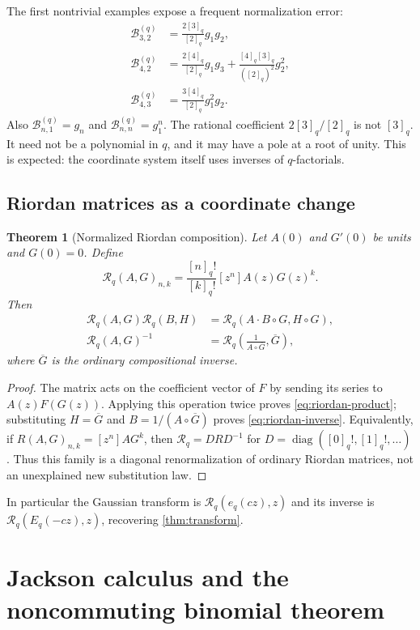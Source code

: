 \documentclass[11pt,a4paper]{article}
\numberwithin{equation}{section}
\newtheorem{theorem}{Theorem}[section]
\theoremstyle{definition}
\theoremstyle{remark}
\newcommand{\qf}[1]{[#1]_{q}!}
\newcommand{\qi}[1]{[#1]_{q}}
\newcommand{\Bq}{\mathcal B^{(q)}}
\DeclareMathOperator{\diag}{diag}
\begin{document}
The first nontrivial examples expose a frequent normalization error:
\begin{align}
 \Bq_{3,2}&=\frac{2\qi3}{\qi2}g_1g_2,\label{eq:Bq32}\\
 \Bq_{4,2}&=\frac{2\qi4}{\qi2}g_1g_3
             +\frac{\qi4\qi3}{(\qi2)^2}g_2^2,\label{eq:Bq42}\\
 \Bq_{4,3}&=\frac{3\qi4}{\qi2}g_1^2g_2.
 \label{eq:Bq43}
\end{align}
Also $\Bq_{n,1}=g_n$ and $\Bq_{n,n}=g_1^n$. The rational coefficient
$2\qi3/\qi2$ is not $\qi3$. It need not be a polynomial in $q$, and it may have a
pole at a root of unity. This is expected: the coordinate system itself uses
inverses of $q$-factorials.

\subsection{Riordan matrices as a coordinate change}
\begin{theorem}[Normalized Riordan composition]\label{thm:riordan}
Let $A(0)$ and $G'(0)$ be units and $G(0)=0$. Define
\begin{equation}\label{eq:riordan-def}
 \mathcal R_q(A,G)_{n,k}=\frac{\qf n}{\qf k}[z^n]A(z)G(z)^k.
\end{equation}
Then
\begin{align}
 \mathcal R_q(A,G)\mathcal R_q(B,H)
  &=\mathcal R_q(A\cdot B\circ G,H\circ G),\label{eq:riordan-product}\\
 \mathcal R_q(A,G)^{-1}
  &=\mathcal R_q\left(\frac1{A\circ\overline G},\overline G\right),
 \label{eq:riordan-inverse}
\end{align}
where $\overline G$ is the ordinary compositional inverse.
\end{theorem}
\begin{proof}
The matrix acts on the coefficient vector of $F$ by sending its series to
$A(z)F(G(z))$. Applying this operation twice proves
\eqref{eq:riordan-product}; substituting $H=\overline G$ and
$B=1/(A\circ\overline G)$ proves \eqref{eq:riordan-inverse}.
Equivalently, if $R(A,G)_{n,k}=[z^n]A G^k$, then
$\mathcal R_q=D R D^{-1}$ for $D=\diag(\qf0,\qf1,\ldots)$.
Thus this family is a diagonal renormalization of ordinary Riordan matrices,
not an unexplained new substitution law.
\end{proof}
In particular the Gaussian transform is
$\mathcal R_q(e_q(cz),z)$ and its inverse is
$\mathcal R_q(E_q(-cz),z)$, recovering \cref{thm:transform}.

\section{Jackson calculus and the noncommuting binomial theorem}\label{sec:jackson}
\end{document}
